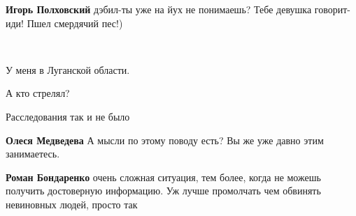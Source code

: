 \begin{itemize}
\begin{itemize}
\textbf{Игорь Полховский} дэбил-ты уже на йух не понимаешь? Тебе девушка говорит-иди! Пшел смердячий пес!)

\end{itemize}

 

🙁

 
У меня в Луганской области.

 
А кто стрелял?

\begin{itemize}
 
Расследования так и не было

 
\textbf{Олеся Медведева} А мысли по этому поводу есть? Вы же уже давно этим занимаетесь.

 
\textbf{Роман Бондаренко} очень сложная ситуация, тем более, когда не можешь получить достоверную информацию. Уж лучше промолчать чем обвинять невиновных людей, просто так


\end{itemize}
\end{itemize}
